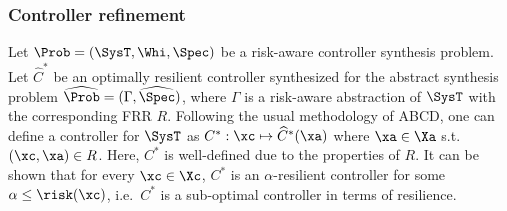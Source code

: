 
\subsubsection{Controller refinement}
Let $\Prob=(\SysT,\Whi,\Spec)$ be a risk-aware controller synthesis problem.
Let  $\widehat{C}^*$ be  an optimally resilient controller synthesized for the abstract synthesis problem $\widehat{\Prob}=(\Gamma,\widehat{\Spec})$, where $\Gamma$ is a risk-aware abstraction of $\SysT$ with the corresponding FRR $R$.
Following the usual methodology of ABCD, one can define a controller for $\SysT$ as $C^*:\xc\mapsto \widehat{C}^*(\xa)$ where $\xa\in \Xa$ s.t.\ $(\xc,\xa)\in R$. Here, $C^*$ is well-defined due to the properties of $R$.
It can be shown that for every $\xc\in \Xc$, $C^*$ is an $\alpha$-resilient controller for some $\alpha \leq \risk(\xc)$, i.e.\ $C^*$ is a sub-optimal controller in terms of resilience.
